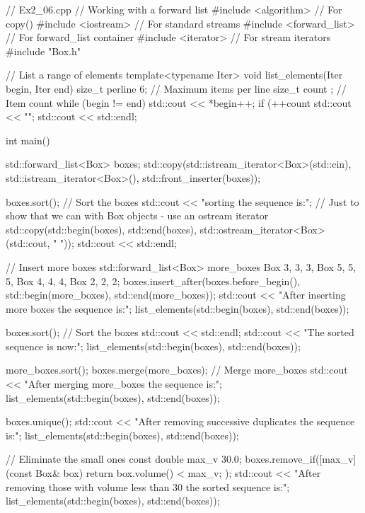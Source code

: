 // Ex2_06.cpp
// Working with a forward list
#include <algorithm>                             // For copy()
#include <iostream>                              // For standard streams
#include <forward_list>                          // For forward_list container
#include <iterator>                              // For stream iterators
#include "Box.h"

// List a range of elements
template<typename Iter>
void list_elements(Iter begin, Iter end)
{
	size_t perline {6};                            // Maximum items per line
	size_t count {};                               // Item count
	while (begin != end)
	{
		std::cout << *begin++;
		if (++count %
		{
			std::cout << "\n";
		}
	}
	std::cout << std::endl;
}

int main()
{
	std::forward_list<Box> boxes;
	std::copy(std::istream_iterator<Box>(std::cin), std::istream_iterator<Box>(), std::front_inserter(boxes));
	
	boxes.sort();                                    // Sort the boxes
	std::cout << "\nAfter sorting the sequence is:\n";
	// Just to show that we can with Box objects - use an ostream iterator
	std::copy(std::begin(boxes), std::end(boxes), std::ostream_iterator<Box>(std::cout, " "));
	std::cout << std::endl;
	
	// Insert more boxes
	std::forward_list<Box> more_boxes {Box {3, 3, 3}, Box {5, 5, 5}, Box {4, 4, 4}, Box {2, 2, 2}};
	boxes.insert_after(boxes.before_begin(), std::begin(more_boxes), std::end(more_boxes));
	std::cout << "After inserting more boxes the sequence is:\n";
	list_elements(std::begin(boxes), std::end(boxes));
	
	boxes.sort();                                    // Sort the boxes
	std::cout << std::endl;
	std::cout << "The sorted sequence is now:\n";
	list_elements(std::begin(boxes), std::end(boxes));
	
	more_boxes.sort();
	boxes.merge(more_boxes);                         // Merge more_boxes
	std::cout << "After merging more_boxes the sequence is:\n";
	list_elements(std::begin(boxes), std::end(boxes));
	
	boxes.unique();
	std::cout << "After removing successive duplicates the sequence is:\n";
	list_elements(std::begin(boxes), std::end(boxes));
	
	// Eliminate the small ones
	const double max_v {30.0};
	boxes.remove_if([max_v](const Box& box){ return box.volume() < max_v; });
	std::cout << "After removing those with volume less than 30 the sorted sequence is:\n";
	list_elements(std::begin(boxes), std::end(boxes));
}